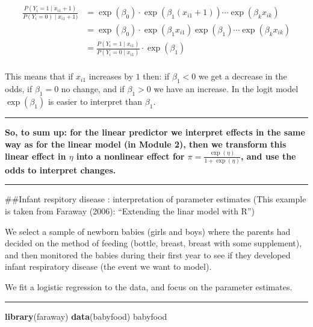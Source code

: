 \documentclass[
]{article}
\newenvironment{Shaded}{\begin{snugshade}}{\end{snugshade}}
\newcommand{\FunctionTok}[1]{\textcolor[rgb]{0.13,0.29,0.53}{\textbf{#1}}}
\newcommand{\NormalTok}[1]{#1}
\begin{document}
\begin{align*}
\frac{P(Y_i=1\mid x_{i1}+1)}{P(Y_i=0)\mid x_{i1}+1)}&=\exp(\beta_0)\cdot \exp(\beta_1 (x_{i1}+1))\cdots\exp(\beta_k x_{ik})\\
&=\exp(\beta_0)\cdot \exp(\beta_1 x_{i1})\exp(\beta_1)\cdots\exp(\beta_k x_{ik})\\
&=\frac{P(Y_i=1\mid x_{i1})}{P(Y_i=0\mid x_{i1})}\cdot \exp(\beta_1)\\
\end{align*}

This means that if \(x_{i1}\) increases by \(1\) then: if \(\beta_1<0\)
we get a decrease in the odds, if \(\beta_1=0\) no change, and if
\(\beta_1>0\) we have an increase. In the logit model \(\exp(\beta_1)\)
is easier to interpret than \(\beta_1\).

\begin{center}\rule{0.5\linewidth}{0.5pt}\end{center}

\textbf{So, to sum up: for the linear predictor we interpret effects in
the same way as for the linear model (in Module 2), then we transform
this linear effect in \(\eta\) into a nonlinear effect for
\(\pi=\frac{\exp(\eta)}{1+\exp(\eta)}\), and use the odds to interpret
changes.}

\begin{center}\rule{0.5\linewidth}{0.5pt}\end{center}

\#\#Infant respitory disease : interpretation of parameter estimates
(This example is taken from Faraway (2006): ``Extending the linar model
with R'')

We select a sample of newborn babies (girls and boys) where the parents
had decided on the method of feeding (bottle, breast, breast with some
supplement), and then monitored the babies during their first year to
see if they developed infant respiratory disease (the event we want to
model).

We fit a logistic regression to the data, and focus on the parameter
estimates.

\begin{center}\rule{0.5\linewidth}{0.5pt}\end{center}

\begin{Shaded}
\begin{Highlighting}[]
\FunctionTok{library}\NormalTok{(faraway)}
\FunctionTok{data}\NormalTok{(babyfood)}
\NormalTok{babyfood}
\end{Highlighting}
\end{Shaded}
\end{document}
